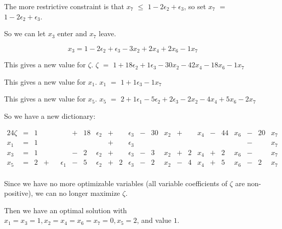 \documentclass[12pt,letterpaper]{article}
\newcommand*\enterleave[2]{
  So we can let #1 enter and #2 leave.
}
\newcommand*\morerestrictive[2]{
  The more restrictive constraint is that #1 $\leq$ #2, so set #1 $=$ #2.
}
\newcommand*\newdict{
  So we have a new dictionary:
}
\newcommand*\newvalue[2]{
  This gives a new value for #1. #1 $ = $ #2
}
\newcommand*\opt{
  Since we have no more optimizable variables
  (all variable coefficients of $\zeta$ are non-positive),
  we can no longer maximize $\zeta$.
}
\newcommand*\optsolution[2]{
  Then we have an optimal solution with #1, and value #2.
}
\newcommand*\eps{\epsilon}
\begin{document}
\begin{enumerate}
      \morerestrictive{$x_7$}{$1 - 2\eps_2 + \eps_3$}

      \enterleave{$x_3$}{$x_7$}

      \[
        x_3 = 1 - 2\eps_2 + \eps_3 - 3 x_2 + 2 x_4 + 2 x_6 - 1 x_7
      \]

      \newvalue{$\zeta$}{$1 + 18 \eps_2 + 1 \eps_3 - 30 x_2 - 42 x_4 - 18 x_6 - 1 x_7$}

      \newvalue{$x_1$}{$1 + 1 \eps_3 - 1 x_7$}

      \newvalue{$x_5$}{$2 + 1 \eps_1 - 5 \eps_2 + 2 \eps_3 - 2 x_2 - 4 x_4 + 5 x_6 - 2 x_7$}

      \newdict

      \begin{alignat*}{24}
        \zeta & {}={} & 1 &       & &        & {}+{} & 18 & \eps_2 & {}+{} &   & \eps_3 & {}-{} & 30 & x_2 & {}+{} &   & x_4 & {}-{} & 44 & x_6 & {}-{} & 20 & x_7 \\
        x_1   & {}={} & 1 &       & &        &       &    &        & {}+{} &   & \eps_3 &       &    &     &       &   &     &       &    &     & {}-{} &    & x_7 \\
        x_3   & {}={} & 1 &       & &        & {}-{} & 2  & \eps_2 & {}+{} &   & \eps_3 & {}-{} & 3  & x_2 & {}+{} & 2 & x_4 & {}+{} & 2  & x_6 & {}-{} &    & x_7 \\
        x_5   & {}={} & 2 & {}+{} & & \eps_1 & {}-{} & 5  & \eps_2 & {}+{} & 2 & \eps_3 & {}-{} & 2  & x_2 & {}-{} & 4 & x_4 & {}+{} & 5  & x_6 & {}-{} & 2  & x_7 \\
      \end{alignat*}

      \opt

      \optsolution{$x_1 = x_3 = 1, x_2 = x_4 = x_6 = x_7 = 0, x_5 = 2$}{$1$}
  \end{enumerate}
\end{document}
